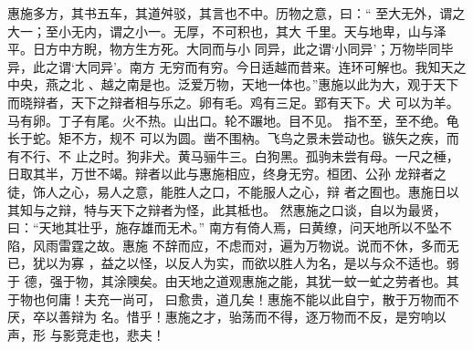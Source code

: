 \documentclass[]{article}
\begin{document}
惠施多方，其书五车，其道舛驳，其言也不中。历物之意，曰：``
至大无外，谓之大一；至小无内，谓之小一。无厚，不可积也，其大
千里。天与地卑，山与泽平。日方中方睨，物方生方死。大同而与小
同异，此之谓`小同异'；万物毕同毕异，此之谓`大同异'。南方
无穷而有穷。今日适越而昔来。连环可解也。我知天之中央，燕之北
、越之南是也。泛爱万物，天地一体也。''惠施以此为大，观于天下
而晓辩者，天下之辩者相与乐之。卵有毛。鸡有三足。郢有天下。犬
可以为羊。马有卵。丁子有尾。火不热。山出口。轮不蹍地。目不见。
指不至，至不绝。龟长于蛇。矩不方，规不
可以为圆。凿不围枘。飞鸟之景未尝动也。镞矢之疾，而有不行、不
止之时。狗非犬。黄马骊牛三。白狗黑。孤驹未尝有母。一尺之棰，
日取其半，万世不竭。辩者以此与惠施相应，终身无穷。桓团、公孙
龙辩者之徒，饰人之心，易人之意，能胜人之口，不能服人之心，辩
者之囿也。惠施日以其知与之辩，特与天下之辩者为怪，此其柢也。
然惠施之口谈，自以为最贤，曰：``天地其壮乎，施存雄而无术。''
南方有倚人焉，曰黄缭，问天地所以不坠不陷，风雨雷霆之故。惠施
不辞而应，不虑而对，遍为万物说。说而不休，多而无已，犹以为寡
，益之以怪，以反人为实，而欲以胜人为名，是以与众不适也。弱于
德，强于物，其涂隩矣。由天地之道观惠施之能，其犹一蚊一虻之劳者也。其于物也何庸！夫充一尚可，
曰愈贵，道几矣！惠施不能以此自宁，散于万物而不厌，卒以善辩为
名。惜乎！惠施之才，骀荡而不得，逐万物而不反，是穷响以声，形
与影竞走也，悲夫！
\end{document}
